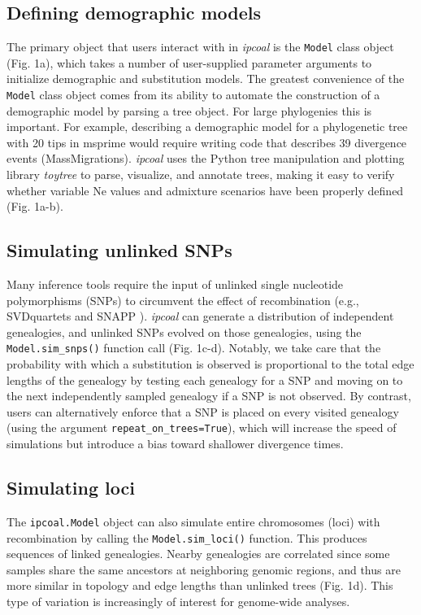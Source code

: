\documentclass[11pt]{article}
\begin{document}
\subsection{Defining demographic models}
The primary object that users interact with in \emph{ipcoal} is the \texttt{Model} class object (Fig. 1a), which takes a number of user-supplied parameter arguments to initialize demographic and substitution models. The greatest convenience of the \texttt{Model} class object comes from its ability to automate the construction of a demographic model by parsing a tree object. For large phylogenies this is important. For example, describing a demographic model for a phylogenetic tree with 20 tips in msprime would require writing code that describes 39 divergence events (MassMigrations). \emph{ipcoal} uses the Python tree manipulation and plotting library \emph{toytree} \citep{eaton_toytree_2020} to parse, visualize, and annotate trees, making it easy to verify whether variable Ne values and admixture scenarios have been properly defined (Fig. 1a-b). 

\subsection{Simulating unlinked SNPs}
Many inference tools require the input of unlinked single nucleotide polymorphisms (SNPs) to circumvent the effect of recombination (e.g., SVDquartets \citep{chifman_quartets_2014} and SNAPP \citep{bryant_snapp_2012}). \emph{ipcoal} can generate a distribution of independent genealogies, and unlinked SNPs evolved on those genealogies, using the \texttt{Model.sim\_snps()} function call (Fig. 1c-d). Notably, we take care that the probability with which a substitution is observed is proportional to the total edge lengths of the genealogy by testing each genealogy for a SNP and moving on to the next independently sampled genealogy if a SNP is not observed. By contrast, users can alternatively enforce that a SNP is placed on every visited genealogy (using the argument \texttt{repeat\_on\_trees=True}), which will increase the speed of simulations but introduce a bias toward shallower divergence times. 

\subsection{Simulating loci}
The \texttt{ipcoal.Model} object can also simulate entire chromosomes (loci) with recombination by calling the \texttt{Model.sim\_loci()} function. This produces sequences of linked genealogies. Nearby genealogies are correlated since some samples share the same ancestors at neighboring genomic regions, and thus are more similar in topology and edge lengths than unlinked trees (Fig. 1d). This type of variation is increasingly of interest for genome-wide analyses.
\end{document}
